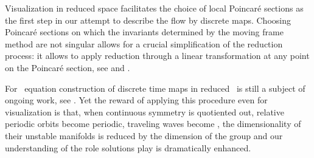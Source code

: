 Visualization in reduced space facilitates the choice of local Poincar\'e sections as the first step in
our attempt to describe the flow by discrete maps. Choosing Poincar\'e sections on which the invariants
determined by the moving frame method are not singular allows for a crucial simplification of the reduction
process: it allows to apply reduction through a linear transformation at any point on the Poincar\'e section,
see  and
.

For \KS\ equation construction of discrete time maps in reduced \statesp\ is still a subject of ongoing
work, see . Yet the reward of applying this procedure even for visualization
is that, when continuous symmetry is quotiented out, relative periodic
orbits become periodic, traveling waves become \eqva, the dimensionality of their unstable manifolds
is reduced by the dimension of the group and our understanding of the role solutions play is dramatically
enhanced.
